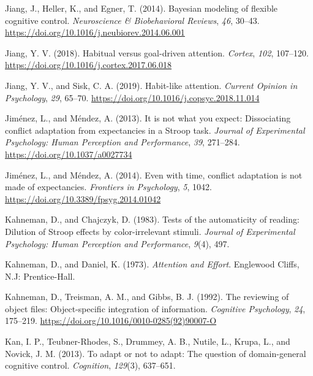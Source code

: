 \documentclass[]{DissertateCUNY}
\begin{document}
\leavevmode\hypertarget{ref-jiang_bayesian_2014}{}%
Jiang, J., Heller, K., and Egner, T. (2014). Bayesian modeling of
flexible cognitive control. \emph{Neuroscience \& Biobehavioral
Reviews}, \emph{46}, 30--43.
\url{https://doi.org/10.1016/j.neubiorev.2014.06.001}

\leavevmode\hypertarget{ref-jiang_habitual_2018}{}%
Jiang, Y. V. (2018). Habitual versus goal-driven attention.
\emph{Cortex}, \emph{102}, 107--120.
\url{https://doi.org/10.1016/j.cortex.2017.06.018}

\leavevmode\hypertarget{ref-jiang_habit-like_2019}{}%
Jiang, Y. V., and Sisk, C. A. (2019). Habit-like attention.
\emph{Current Opinion in Psychology}, \emph{29}, 65--70.
\url{https://doi.org/10.1016/j.copsyc.2018.11.014}

\leavevmode\hypertarget{ref-jimenez_it_2013}{}%
Jiménez, L., and Méndez, A. (2013). It is not what you expect:
Dissociating conflict adaptation from expectancies in a Stroop task.
\emph{Journal of Experimental Psychology: Human Perception and
Performance}, \emph{39}, 271--284.
\url{https://doi.org/10.1037/a0027734}

\leavevmode\hypertarget{ref-jimenez_even_2014}{}%
Jiménez, L., and Méndez, A. (2014). Even with time, conflict adaptation
is not made of expectancies. \emph{Frontiers in Psychology}, \emph{5},
1042. \url{https://doi.org/10.3389/fpsyg.2014.01042}

\leavevmode\hypertarget{ref-kahneman_tests_1983}{}%
Kahneman, D., and Chajczyk, D. (1983). Tests of the automaticity of
reading: Dilution of Stroop effects by color-irrelevant stimuli.
\emph{Journal of Experimental Psychology: Human Perception and
Performance}, \emph{9}(4), 497.

\leavevmode\hypertarget{ref-kahneman_attention_1973}{}%
Kahneman, D., and Daniel, K. (1973). \emph{Attention and Effort}.
Englewood Cliffs, N.J: Prentice-Hall.

\leavevmode\hypertarget{ref-kahneman_reviewing_1992}{}%
Kahneman, D., Treisman, A. M., and Gibbs, B. J. (1992). The reviewing of
object files: Object-specific integration of information.
\emph{Cognitive Psychology}, \emph{24}, 175--219.
\url{https://doi.org/10.1016/0010-0285(92)90007-O}

\leavevmode\hypertarget{ref-kan_adapt_2013}{}%
Kan, I. P., Teubner-Rhodes, S., Drummey, A. B., Nutile, L., Krupa, L.,
and Novick, J. M. (2013). To adapt or not to adapt: The question of
domain-general cognitive control. \emph{Cognition}, \emph{129}(3),
637--651.
\end{document}
